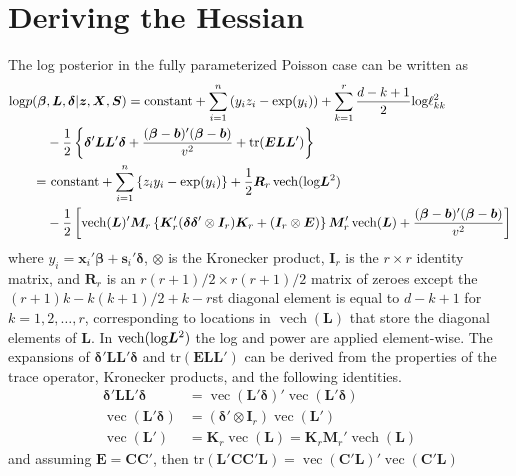 \documentclass[12pt]{article}
\newcommand{\Appendix}
{%
\def\thesection{Appendix~\Alph{section}}
\def\thesubsection{A.\arabic{subsection}}
}
\def\log{\hbox{log}}
\DeclareMathOperator{\vect}{vec}
\DeclareMathOperator{\vech}{vech}
\begin{document}
\section*{Deriving the Hessian}\label{sec:hess}
\begin{appendix}
\Appendix    %
\renewcommand{\theequation}{B.\arabic{equation}}
\setcounter{equation}{0}

The log posterior in the fully parameterized Poisson case can be written as
\begin{align*}
\log p(\bm{\beta}&, \bm{L}, \bm{\delta}|\bm{z}, \bm{X}, \bm{S}) = \mathrm{constant}+ \sum_{i=1}^n\left(y_iz_i - \exp(y_i)\right) + \sum_{k=1}^r \frac{d - k + 1}{2}\log\ell_{kk}^2\\
& - \frac{1}{2}\left\{\bm{\delta}'\bm{L}\bm{L}'\bm{\delta}+\frac{(\bm{\beta} - \bm{b})'(\bm{\beta} - \bm{b})}{v^2} + \mathrm{tr}(\bm{E}\bm{L}\bm{L}')\right\}\\ 
=&\ \mathrm{constant} + \sum_{i=1}^n \left\{z_iy_i - \exp(y_i)\right\} + \frac{1}{2}\bm{R}_r\vech(\log\bm{L}^2)\\
&  -\frac{1}{2}\left[\vech(\bm{L})'\bm{M}_r\left\{\bm{K}_r'(\bm{\delta}\bm{\delta}'\otimes \bm{I}_r)\bm{K}_r + (\bm{I}_r\otimes \bm{E})\right\}\bm{M}_r'\vech(\bm{L})+\frac{(\bm{\beta}-\bm{b})'(\bm{\beta}-\bm{b})}{v^2}\right]
\end{align*}
where $y_i = \bm{x}_i'\bm{\beta} + \bm{s}_i'\bm{\delta}$, $\otimes$ is the Kronecker product, $\bm{I}_r$ is the $r\times r$ identity matrix, and $\bm{R}_r$ is an $r(r+1)/2\times r(r+1)/2$ matrix of zeroes except the $(r + 1)k - k(k+1)/2 + k - r$st diagonal element is equal to $d - k + 1$ for $k=1, 2, \dots, r$, corresponding to locations in $\vech(\bm{L})$ that store the diagonal elements of $\bm{L}$. In $\vech(\log\bm{L}^2)$ the log and power are applied element-wise. The expansions of $\bm{\delta}'\bm{L}\bm{L}'\bm{\delta}$ and $\mathrm{tr}(\bm{E}\bm{L}\bm{L}')$ can be derived from the properties of the trace operator, Kronecker products, and the following identities.
\begin{align*}
\bm{\delta}'\bm{L}\bm{L}'\bm{\delta}& = \vect(\bm{L}'\bm{\delta})'\vect(\bm{L}'\bm{\delta})\\ 
\vect(\bm{L}'\bm{\delta})& = (\bm{\delta}'\otimes \bm{I}_r)\vect(\bm{L}')\\
\vect(\bm{L}')& = \bm{K}_r\vect(\bm{L}) = \bm{K}_r\bm{M}_r'\vech(\bm{L})
\end{align*}
and assuming $\bm{E} = \bm{C}\bm{C}'$, then $\mathrm{tr}(\bm{L'}\bm{C}\bm{C}'\bm{L}) = \vect(\bm{C}'\bm{L})'\vect(\bm{C}'\bm{L})$

\end{appendix}
\end{document}
